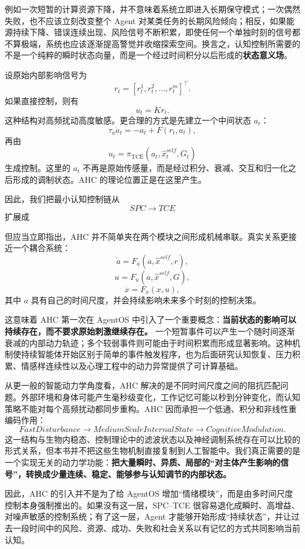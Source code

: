 例如一次短暂的计算资源下降，并不意味着系统立即进入长期保守模式；一次偶然失败，也不应该立刻改变整个 Agent 对某类任务的长期风险倾向；相反，如果能源持续下降、错误连续出现、风险信号不断积累，即使任何一个单独时刻的信号都不算极端，系统也应该逐渐提高警觉并收缩探索空间。换言之，认知控制所需要的不是一个纯粹的瞬时状态向量，而是一个经过时间积分以后形成的\textbf{状态意义场}。

设原始内部影响信号为
\[
r_t
=
[r_t^{1},r_t^{2},\ldots,r_t^{m}]^\top .
\]
如果直接控制，则有
\[
u_t = K r_t .
\]
这种结构对高频扰动高度敏感。更合理的方式是先建立一个中间状态 \(a_t\)：
\[
\tau_a \dot a_t
=
-a_t
+
F(r_t,a_t),
\]
再由
\[
u_t
=
\pi_{\mathrm{TCE}}
(a_t,\hat{x}^{self}_t,G_t)
\]
生成控制。这里的 \(a_t\) 不再是原始传感量，而是经过积分、衰减、交互和归一化之后形成的调制状态。AHC 的理论位置正是在这里产生。

因此，我们把最小认知控制链从
\[
SPC\rightarrow TCE
\]
扩展成
\begin{statementbox}
\centering
{}
\end{statementbox}
但应当立即指出，AHC 并不简单夹在两个模块之间形成机械串联。真实关系更接近一个耦合系统：
\[
\dot a
=
F_a(a,\hat{x}^{self},r),
\]
\[
u
=
F_u(a,\hat{x}^{self},G),
\]
\[
\dot x
=
F_x(x,u),
\]
其中 \(a\) 具有自己的时间尺度，并会持续影响未来多个时刻的控制决策。

这意味着 AHC 第一次在 AgentOS 中引入了一个重要概念：\textbf{当前状态的影响可以持续存在，而不要求原始刺激继续存在。} 一个短暂事件可以产生一个随时间逐渐衰减的内部动力轨迹；多个较弱事件则可能由于时间积累而形成显著影响。这种机制使持续智能体开始区别于简单的事件触发程序，也为后面研究认知恢复、压力积累、情感样连续性以及心理工程中的动力异常提供了可计算基础。

从更一般的智能动力学角度看，AHC 解决的是不同时间尺度之间的阻抗匹配问题。外部环境和身体可能产生毫秒级变化，工作记忆可能以秒到分钟变化，而认知策略不能对每个高频扰动都同步重构。AHC 因而承担一个低通、积分和非线性重编码作用：
\[
FastDisturbance
\rightarrow
MediumScaleInternalState
\rightarrow
CognitiveModulation .
\]
这一结构与生物内稳态、控制理论中的滤波状态以及神经调制系统存在可以比较的形式关系，但本书并不把这些生物机制直接复制到人工智能中。我们真正需要的是一个实现无关的动力学功能：\textbf{把大量瞬时、异质、局部的“对主体产生影响的信号”，转换成少量连续、稳定、能够参与认知调节的内部状态。}

因此，AHC 的引入并不是为了给 AgentOS 增加“情绪模块”，而是由多时间尺度控制本身强制推出的。如果没有这一层，SPC--TCE 很容易退化成瞬时、高增益、对噪声敏感的控制系统；有了这一层，Agent 才能够开始形成“持续状态”，并让过去一段时间中的风险、资源、成功、失败和社会关系以有记忆的方式共同影响当前认知。

